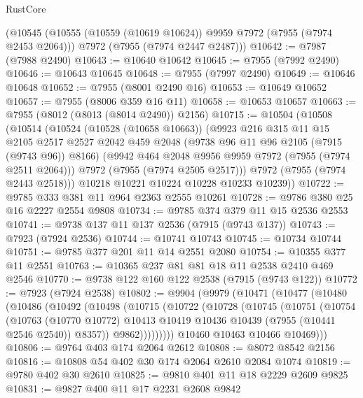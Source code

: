 \begin{lexlean}{RustCore}
\begin{coremodule}
    (@10545
      (@10555 (@10559 (@10619 @10624)) @9959 @7972 (@7955 (@7974 @2453 @2064)))
      @7972
      (@7955 (@7974 @2447 @2487)))
@10642 := @7987 (@7988 @2490)
@10643 := @10640 @10642
@10645 := @7955 (@7992 @2490)
@10646 := @10643 @10645
@10648 := @7955 (@7997 @2490)
@10649 := @10646 @10648
@10652 := @7955 (@8001 @2490 @16)
@10653 := @10649 @10652
@10657 := @7955 (@8006 @359 @16 @11)
@10658 := @10653 @10657
@10663 := @7955 (@8012 (@8013 (@8014 @2490)) @2156)
@10715 := @10504
    (@10508
      (@10514
        (@10524
          (@10528 (@10658 @10663))
          (@9923
            @216
            @315
            @11
            @15
            @2105
            @2517
            @2527
            @2042
            @459
            @2048
            (@9738 @96 @11 @96 @2105 (@7915 (@9743 @96)) @8166)
            (@9942 @464 @2048 @9956 @9959 @7972 (@7955 (@7974 @2511 @2064)))
            @7972
            (@7955 (@7974 @2505 @2517)))
          @7972
          (@7955 (@7974 @2443 @2518)))
        @10218
        @10221
        @10224
        @10228
        @10233
        @10239))
@10722 := @9785 @333 @381 @11 @964 @2363 @2555 @10261
@10728 := @9786 @380 @25 @16 @2227 @2554 @9808
@10734 := @9785 @374 @379 @11 @15 @2536 @2553
@10741 := @9738 @137 @11 @137 @2536 (@7915 (@9743 @137))
@10743 := @7923 (@7924 @2536)
@10744 := @10741 @10743
@10745 := @10734 @10744
@10751 := @9785 @377 @201 @11 @14 @2551 @2080
@10754 := @10355 @377 @11 @2551
@10763 := @10365 @237 @81 @81 @18 @11 @2538 @2410 @469 @2546
@10770 := @9738 @122 @160 @122 @2538 (@7915 (@9743 @122))
@10772 := @7923 (@7924 @2538)
@10802 := @9904
    (@9979
      (@10471
        (@10477
          (@10480
            (@10486
              (@10492
                (@10498
                  (@10715
                    (@10722
                      (@10728
                        (@10745
                          (@10751
                            (@10754
                              (@10763
                                (@10770 @10772)
                                @10413
                                @10419
                                @10436
                                @10439
                                (@7955 (@10441 @2546 @2540))
                                @8357))
                            @9862)))))))))
          @10460
          @10463
          @10466
          @10469)))
@10806 := @9764 @403 @174 @2064 @2612
@10808 := @8072 @8542 @2156
@10816 := @10808 @54 @402 @30 @174 @2064 @2610 @2084 @1074
@10819 := @9780 @402 @30 @2610
@10825 := @9810 @401 @11 @18 @2229 @2609 @9825
@10831 := @9827 @400 @11 @17 @2231 @2608 @9842

\end{coremodule}
\end{lexlean}
